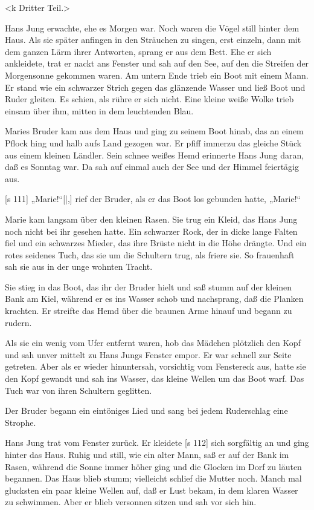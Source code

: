 <k Dritter Teil.>


Hans Jung erwachte, ehe es Morgen war. Noch
waren die Vögel still hinter dem Haus. Als sie
später anfingen in den Sträuchen zu singen, erst
einzeln, dann mit dem ganzen Lärm ihrer Antworten,
sprang er aus dem Bett. Ehe er sich ankleidete, trat
er nackt ans Fenster und sah auf den See, auf den
die Streifen der Morgensonne gekommen waren.
Am untern Ende trieb ein Boot mit einem Mann.
Er stand wie ein schwarzer Strich gegen das glänzende
Wasser und ließ Boot und Ruder gleiten. Es schien,
als rühre er sich nicht. Eine kleine weiße Wolke
trieb einsam über ihm, mitten in dem leuchtenden Blau.

Maries Bruder kam aus dem Haus und ging
zu seinem Boot hinab, das an einem Pflock hing und
halb aufs Land gezogen war. Er pfiff immerzu das
gleiche Stück aus einem kleinen Ländler. Sein schnee­
weißes Hemd erinnerte Hans Jung daran, daß es
Sonntag war. Da sah auf einmal auch der See
und der Himmel feiertägig aus.

[s 111]
„Marie!“[|,] rief der Bruder, als er das Boot los­
gebunden hatte, „Marie!“

Marie kam langsam über den kleinen Rasen.
Sie trug ein Kleid, das Hans Jung noch nicht bei
ihr gesehen hatte. Ein schwarzer Rock, der in dicke
lange Falten fiel und ein schwarzes Mieder, das ihre
Brüste nicht in die Höhe drängte. Und ein rotes
seidenes Tuch, das sie um die Schultern trug, als
friere sie. So frauenhaft sah sie aus in der unge­
wohnten Tracht.

Sie stieg in das Boot, das ihr der Bruder hielt
und saß stumm auf der kleinen Bank am Kiel, während
er es ins Wasser schob und nachsprang, daß die
Planken krachten. Er streifte das Hemd über die
braunen Arme hinauf und begann zu rudern.

Als sie ein wenig vom Ufer entfernt waren,
hob das Mädchen plötzlich den Kopf und sah unver­
mittelt zu Hans Jungs Fenster empor. Er war schnell
zur Seite getreten. Aber als er wieder hinuntersah,
vorsichtig vom Fenstereck aus, hatte sie den Kopf
gewandt und sah ins Wasser, das kleine Wellen um
das Boot warf. Das Tuch war von ihren Schultern
geglitten.

Der Bruder begann ein eintöniges Lied und sang
bei jedem Ruderschlag eine Strophe.

Hans Jung trat vom Fenster zurück. Er kleidete
[s 112]
sich sorgfältig an und ging hinter das Haus. Ruhig
und still, wie ein alter Mann, saß er auf der Bank
im Rasen, während die Sonne immer höher ging und
die Glocken im Dorf zu läuten begannen. Das Haus
blieb stumm; vielleicht schlief die Mutter noch. Manch­
mal glucksten ein paar kleine Wellen auf, daß er
Lust bekam, in dem klaren Wasser zu schwimmen.
Aber er blieb versonnen sitzen und sah vor sich hin.

